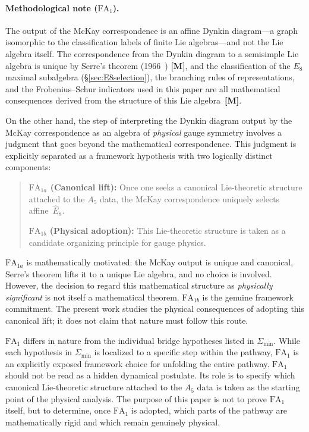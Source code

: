 \documentclass[sn-mathphys-num,Numbered]{sn-jnl}
\theoremstyle{thmstyleone}
\theoremstyle{thmstylethree}
\newcommand{\Amin}{\Sigma_{\min}}
\newcommand{\Ehat}{\hat{E}}
\newcommand{\layerM}{\textbf{[M]}}
\begin{document}
\paragraph{Methodological note ($\mathrm{FA}_1$).}
The output of the McKay correspondence is an affine Dynkin diagram---a graph
isomorphic to the classification labels of finite Lie algebras---and not the
Lie algebra itself.  The correspondence from the Dynkin diagram to a
semisimple Lie algebra is unique by Serre's theorem (1966~\cite{Serre1966})
\layerM, and the classification of the $E_8$ maximal subalgebra (\S\ref{sec:E8selection}), the
branching rules of representations, and the Frobenius--Schur indicators used
in this paper are all mathematical consequences derived from the structure of
this Lie algebra~\layerM.

On the other hand, the step of interpreting the Dynkin diagram output by the
McKay correspondence as an algebra of \emph{physical} gauge symmetry involves
a judgment that goes beyond the mathematical correspondence.
This judgment is explicitly separated as a framework hypothesis with two
logically distinct components:

\begin{quote}
\textbf{$\mathrm{FA}_{1a}$ (Canonical lift):}
Once one seeks a canonical Lie-theoretic structure attached to the $A_5$
data, the McKay correspondence uniquely selects affine~$\Ehat_8$.

\textbf{$\mathrm{FA}_{1b}$ (Physical adoption):}
This Lie-theoretic structure is taken as a candidate organizing principle
for gauge physics.
\end{quote}

$\mathrm{FA}_{1a}$ is mathematically motivated: the McKay output is unique
and canonical, Serre's theorem lifts it to a unique Lie algebra, and no
choice is involved.  However, the decision to regard this mathematical
structure as \emph{physically significant} is not itself a mathematical
theorem.  $\mathrm{FA}_{1b}$ is the genuine framework commitment.
The present work studies the physical consequences of adopting this canonical
lift; it does not claim that nature must follow this route.

$\mathrm{FA}_1$ differs in nature from the individual bridge hypotheses listed
in $\Amin$.  While each hypothesis in $\Amin$ is localized to a specific step
within the pathway, $\mathrm{FA}_1$ is an explicitly exposed framework choice
for unfolding the entire pathway.
$\mathrm{FA}_1$ should not be read as a hidden dynamical postulate.
Its role is to specify which canonical Lie-theoretic structure attached to the
$A_5$ data is taken as the starting point of the physical analysis.
The purpose of this paper is not to prove $\mathrm{FA}_1$ itself, but to
determine, once $\mathrm{FA}_1$ is adopted, which parts of the pathway are
mathematically rigid and which remain genuinely physical.
\end{document}

